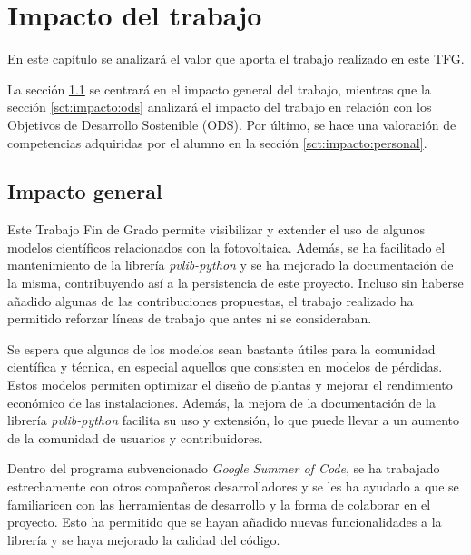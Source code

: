 \chapter{Impacto del trabajo} \label{chp:impacto}

En este capítulo se analizará el valor que aporta el trabajo realizado en este TFG.

La sección \ref{sct:impacto:general} se centrará en el impacto general del trabajo, mientras que la sección \ref{sct:impacto:ods} analizará el impacto del trabajo en relación con los Objetivos de Desarrollo Sostenible (ODS). Por último, se hace una valoración de competencias adquiridas por el alumno en la sección \ref{sct:impacto:personal}.


\section{Impacto general} \label{sct:impacto:general}

Este Trabajo Fin de Grado permite visibilizar y extender el uso de algunos modelos científicos relacionados con la fotovoltaica. Además, se ha facilitado el mantenimiento de la librería \textit{pvlib-python} y se ha mejorado la documentación de la misma, contribuyendo así a la persistencia de este proyecto. Incluso sin haberse añadido algunas de las contribuciones propuestas, el trabajo realizado ha permitido reforzar líneas de trabajo que antes ni se consideraban.

Se espera que algunos de los modelos sean bastante útiles para la comunidad científica y técnica, en especial aquellos que consisten en modelos de pérdidas. Estos modelos permiten optimizar el diseño de plantas y mejorar el rendimiento económico de las instalaciones. Además, la mejora de la documentación de la librería \textit{pvlib-python} facilita su uso y extensión, lo que puede llevar a un aumento de la comunidad de usuarios y contribuidores.

Dentro del programa subvencionado \textit{Google Summer of Code}, se ha trabajado estrechamente con otros compañeros desarrolladores y se les ha ayudado a que se familiaricen con las herramientas de desarrollo y la forma de colaborar en el proyecto. Esto ha permitido que se hayan añadido nuevas funcionalidades a la librería y se haya mejorado la calidad del código.

